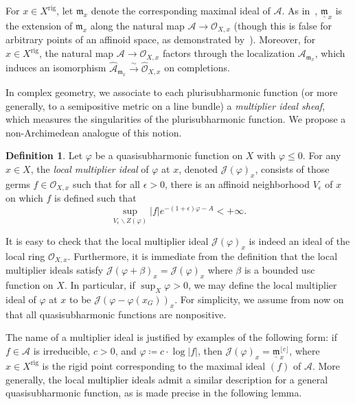 \documentclass[10pt,reqno]{amsart}
\theoremstyle{plain}
\theoremstyle{definition}
\newtheorem{definition}[theorem]{Definition}
\newcommand{\frakm}{\mathfrak{m}}
\numberwithin{equation}{section}
\renewcommand{\O}{\mathcal{O}}
\newcommand{\J}{\mathcal{J}}
\DeclareMathOperator{\rig}{rig}
\begin{document}
For $x \in X^{\rig}$, let $\frakm_x$ denote the corresponding maximal ideal of $\mathcal{A}$. As in~\cite[7.3.2/1]{bgr}, $\underline{\frakm}_x$ is the extension of $\frakm_x$ along the natural map $\mathcal{A} \to \O_{X,x}$ (though this is false for arbitrary points of an affinoid space, as demonstrated by~\cite[Remark 2.2.9]{berkovich93}). Moreover, for $x \in X^{\rig}$, the natural map $\mathcal{A} \to \O_{X,x}$ factors through the localization $\mathcal{A}_{\frakm_x}$, which induces an isomorphism $\widehat{\mathcal{A}}_{\frakm_x} \stackrel{\sim}{\to} \widehat{\O}_{X,x}$ on completions.

In complex geometry, we associate to each plurisubharmonic function (or more generally, to a semipositive metric on a line bundle) a \emph{multiplier ideal sheaf}, which measures the singularities of the plurisubharmonic function. 
We propose a non-Archimedean analogue of this notion.

\begin{definition}
Let $\varphi$ be a quasisubharmonic function on $X$ with $\varphi \leq 0$. 
For any $x \in X$, the \emph{local multiplier ideal} of $\varphi$ at $x$, denoted $\J(\varphi)_x$, consists of those germs $f \in \O_{X,x}$ such that for all $\epsilon > 0$, there is an affinoid neighborhood $V_{\epsilon}$ of $x$ on which $f$ is defined such that 
$$
\sup_{V_{\epsilon} \backslash Z(\varphi)} |f|e^{-(1+\epsilon)\varphi - A} < +\infty.
$$
\end{definition}

It is easy to check that the local multiplier ideal $\J(\varphi)_x$ is indeed an ideal of the local ring $\O_{X,x}$. Furthermore, it is immediate from the definition that the local multiplier ideals satisfy $\J(\varphi + \beta)_x = \J(\varphi)_x$ where $\beta$ is a bounded usc function on $X$. In particular, if $\sup_X \varphi > 0$, we may define the local multiplier ideal of $\varphi$ at $x$ to be $\J(\varphi - \varphi(x_G))_x$. For simplicity, we assume from now on that all quasisubharmonic functions are nonpositive.

The name of a multiplier ideal is justified by examples of the following form: if $f \in \mathcal{A}$ is irreducible, $c > 0$, and $\varphi \coloneqq c \cdot \log |f|$, then $\J(\varphi)_x = \underline{\frakm}_x^{\lfloor c \rfloor}$, where $x \in X^{\rig}$ is the rigid point corresponding to the maximal ideal $(f)$ of $\mathcal{A}$.  More generally, the local multiplier ideals admit a similar description for a general quasisubharmonic function, as is made precise in the following lemma.
\end{document}

